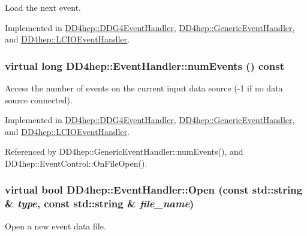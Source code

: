 Load the next event. 

Implemented in \hyperlink{class_d_d4hep_1_1_d_d_g4_event_handler_a02ecd0dfced58988ab84242cb9fdfd44}{DD4hep::DDG4EventHandler}, \hyperlink{class_d_d4hep_1_1_generic_event_handler_a0dc8d4d5dde63d3278f67da79e86b590}{DD4hep::GenericEventHandler}, and \hyperlink{class_d_d4hep_1_1_l_c_i_o_event_handler_a14966ef5f33d58b1f0f3b952a334d48f}{DD4hep::LCIOEventHandler}.\hypertarget{class_d_d4hep_1_1_event_handler_a005436bba029439b513645485e3c0ff5}{
\subsubsection[{numEvents}]{\setlength{\rightskip}{0pt plus 5cm}virtual long DD4hep::EventHandler::numEvents () const}}
\label{class_d_d4hep_1_1_event_handler_a005436bba029439b513645485e3c0ff5}


Access the number of events on the current input data source (-\/1 if no data source connected). 

Implemented in \hyperlink{class_d_d4hep_1_1_d_d_g4_event_handler_a0c0858e77b1bb47621738694c31d5ed6}{DD4hep::DDG4EventHandler}, \hyperlink{class_d_d4hep_1_1_generic_event_handler_a48f6771f5f90bd353e7b242f247a91cb}{DD4hep::GenericEventHandler}, and \hyperlink{class_d_d4hep_1_1_l_c_i_o_event_handler_a922a7d225b2e0944c850965f9983758f}{DD4hep::LCIOEventHandler}.

Referenced by DD4hep::GenericEventHandler::numEvents(), and DD4hep::EventControl::OnFileOpen().\hypertarget{class_d_d4hep_1_1_event_handler_a90995d3b610beee9d9f7fafcc060626b}{
\subsubsection[{Open}]{\setlength{\rightskip}{0pt plus 5cm}virtual bool DD4hep::EventHandler::Open (const std::string \& {\em type}, \/  const std::string \& {\em file\_\-name})}}
\label{class_d_d4hep_1_1_event_handler_a90995d3b610beee9d9f7fafcc060626b}


Open a new event data file. 

